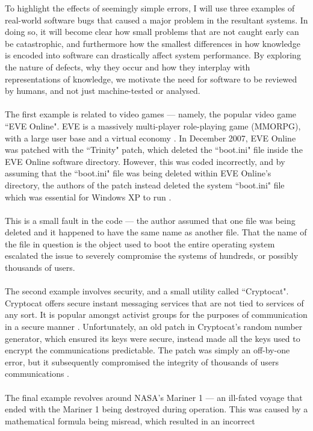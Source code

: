 To highlight the effects of seemingly simple errors, I will use three examples of real-world
software bugs that caused a major problem in the resultant systems.
In doing so, it will become clear how small problems that are not caught early can be catastrophic,
and furthermore how the smallest differences in how knowledge is encoded into software can
drastically affect system performance.
By exploring the nature of defects, why they occur and how they interplay with representations of
knowledge, we motivate the need for software to be reviewed by humans, and not just machine-tested
or analysed.\\
\\
The first example is related to video games --- namely, the popular video game ``EVE Online".
EVE is a massively multi-player role-playing game (MMORPG), with a large user base and a virtual
economy \FIXME.
In December 2007, EVE Online was patched with the ``Trinity" patch, which deleted the ``boot.ini"
file inside the EVE Online software directory.
However, this was coded incorrectly, and by assuming that the ``boot.ini" file was being deleted
within EVE Online's directory, the authors of the patch instead deleted the system ``boot.ini" file
which was essential for Windows XP to run \FIXME.\\
\\
This is a small fault in the code --- the author assumed that one file was being deleted and it
happened to have the same name as another file.
That the name of the file in question is the object used to boot the entire operating system
escalated the issue to severely compromise the systems of hundreds, or possibly thousands of
users.\\
\\
The second example involves security, and a small utility called ``Cryptocat".
Cryptocat offers secure instant messaging services that are not tied to services of any sort.
It is popular amongst activist groups for the purposes of communication in a secure manner \FIXME.
Unfortunately, an old patch in Cryptocat's random number generator, which ensured its keys were
secure, instead made all the keys used to encrypt the communications predictable.
The patch was simply an off-by-one error, but it subsequently compromised the integrity of thousands
of users communications \FIXME.\\
\\
The final example revolves around NASA's Mariner 1 --- an ill-fated voyage that ended with the
Mariner 1 being destroyed during operation.
This was caused by a mathematical formula being misread, which resulted in an incorrect
